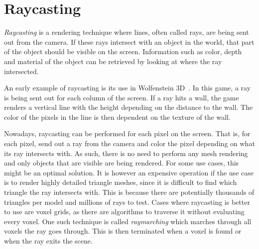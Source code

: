 

\section{Raycasting}
\textit{Raycasting} is a rendering technique where lines, often called rays, are being sent out from the camera.
If these rays intersect with an object in the world, that part of the object should be visible on the screen.
Information such as color, depth and material of the object can be retrieved by looking at where the ray intersected.

An early example of raycasting is its use in Wolfenstein 3D~\cite{wolf3d}.
In this game, a ray is being sent out for each column of the screen.
If a ray hits a wall, the game renders a vertical line with the height depending on the distance to the wall.
The color of the pixels in the line is then dependent on the texture of the wall.

Nowadays, raycasting can be performed for each pixel on the screen.
That is, for each pixel, send out a ray from the camera and color the pixel depending on what its ray intersects with.
As such, there is no need to perform any mesh rendering and only objects that are visible are being rendered.
For some use cases, this might be an optimal solution.
It is however an expensive operation if the use case is to render highly detailed triangle meshes, since it is difficult to find which triangle the ray intersects with.
This is because there are potentially thousands of triangles per model and millions of rays to test. 
Cases where raycasting is better to use are voxel grids, as there are algorithms to traverse it without evaluating every voxel.
One such technique is called \textit{raymarching} which marches through all voxels the ray goes through.
This is then terminated when a voxel is found or when the ray exits the scene.
